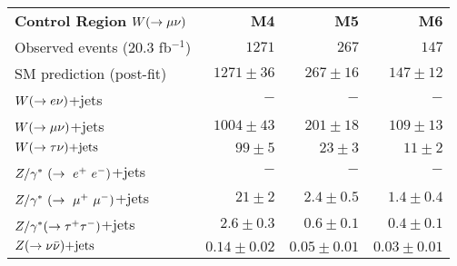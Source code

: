 \begin{table}[!ht]
\begin{center}
\begin{small}
\begin{tabular*}{\textwidth}{@{\extracolsep{\fill}}lrrr}
    
    \hline \hline
                 & & & \\                                                          
    \hline 


{\bf Control Region} $W(\rightarrow \mu \nu)$  & \textbf{M4} & \textbf{M5} & \textbf{M6}  \\
    Observed events  (20.3 fb${}^{-1}$)& $1271$         & $267$          &  $147$           \\ \hline
                                                                                           
    SM prediction (post-fit)                     & $1271 \pm 36$  & $267 \pm 16$   &  $147 \pm 12$   \\ \hline
                                                                                           
    $W(\rightarrow e \nu)$+jets                             & $-$           & $-$           &  $-$           \\
                                                                                           
    $W(\rightarrow \mu \nu)$+jets                             & $1004 \pm 43$  & $201 \pm 18$   &  $109 \pm 13$   \\
                                                                                           
    $W(\rightarrow \tau \nu)\text{+jets}$                             & $99 \pm 5$     & $23 \pm 3$     &  $11 \pm 2$     \\
                                                                                           
    $Z/\gamma^*~(\rightarrow~e^+~e^-)$+jets                             & $-$           & $-$           &  $-$           \\
                                                                                           
    $Z/\gamma^*~(\rightarrow~\mu^+~\mu^-)$+jets                             & $21 \pm 2$     & $2.4 \pm 0.5$  &  $1.4 \pm 0.4$  \\
                                                                                           
    $Z/\gamma^*(\rightarrow \tau^+ \tau^-)$+jets                             & $2.6 \pm 0.3$  & $0.6 \pm 0.1$  &  $0.4 \pm 0.1$  \\
                                                                                           
    $Z(\rightarrow \nu \bar{\nu})\text{+jets}$                             & $0.14 \pm 0.02$& $0.05 \pm 0.01$&  $0.03 \pm 0.01$\\
                                                                                           

\end{tabular*}
\end{small}
\end{center}
\end{table}

